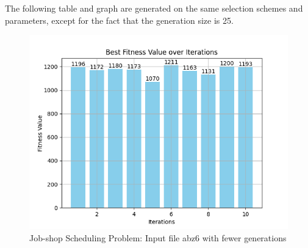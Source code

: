\documentclass[12pt]{article}
\begin{document}
The following table and graph are generated on the same selection schemes and parameters, except for the fact that the generation size is 25. 

\newpage

\begin{figure}[h]
    \centering
    \includegraphics[width=1\textwidth]{images/JSSP_rntrbestscorelessgensABZ6.png}
    \caption{Job-shop Scheduling Problem: Input file abz6 with fewer generations}
\end{figure}

\newpage
\end{document}
